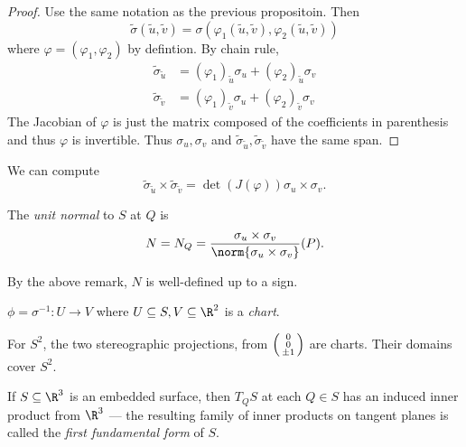 \documentclass[a4paper]{article}
\theoremstyle{definition}
\begin{document}
\begin{proof}
  Use the same notation as the previous propositoin. Then
  \[
    \tilde \sigma(\tilde u, \tilde v) = \sigma(\varphi_1(\tilde u, \tilde v), \varphi_2(\tilde u, \tilde v))
  \]
  where \(\varphi = (\varphi_1, \varphi_2)\) by defintion. By chain rule,
  \begin{align*}
    \tilde \sigma_{\tilde u} &= (\varphi_1)_{\tilde u} \sigma_u + (\varphi_2)_{\tilde u} \sigma_v \\
    \tilde \sigma_{\tilde v} &= (\varphi_1)_{\tilde v} \sigma_u + (\varphi_2)_{\tilde v} \sigma_v
  \end{align*}
  The Jacobian of \(\varphi\) is just the matrix composed of the coefficients in parenthesis and thus \(\varphi\) is invertible. Thus \(\sigma_u, \sigma_v\) and \(\tilde \sigma_{\tilde u}, \tilde \sigma_{\tilde v}\) have the same span.
\end{proof}

\begin{remark}
  We can compute
  \[
    \tilde \sigma_{\tilde u} \times \tilde \sigma_{\tilde v} = \det(J(\varphi)) \sigma_u \times \sigma_v.
  \]
\end{remark}

\begin{definition}
  The \emph{unit normal} to \(S\) at \(Q\) is
  \[
    N = N_Q = \frac{\sigma_u \times \sigma_v}{\norm{\sigma_u \times \sigma_v}}(P).
  \]
\end{definition}

By the above remark, \(N\) is well-defined up to a sign.

\begin{definition}[Chart]
  \(\phi = \sigma^{-1}: U \to V\) where \(U \subseteq S, V \subseteq \R^2\) is a \emph{chart}.
\end{definition}

\begin{eg}
  For \(S^2\), the two stereographic projections, from \(\begin{psmallmatrix} 0 \\ 0 \\ \pm 1 \end{psmallmatrix}\) are charts. Their domains cover \(S^2\).
\end{eg}

\begin{definition}
  If \(S \subseteq \R^3\) is an embedded surface, then \(T_QS\) at each \(Q \in S\) has an induced inner product from \(\R^3\) --- the resulting family of inner products on tangent planes is called the \emph{first fundamental form} of \(S\).
\end{definition}
\end{document}
